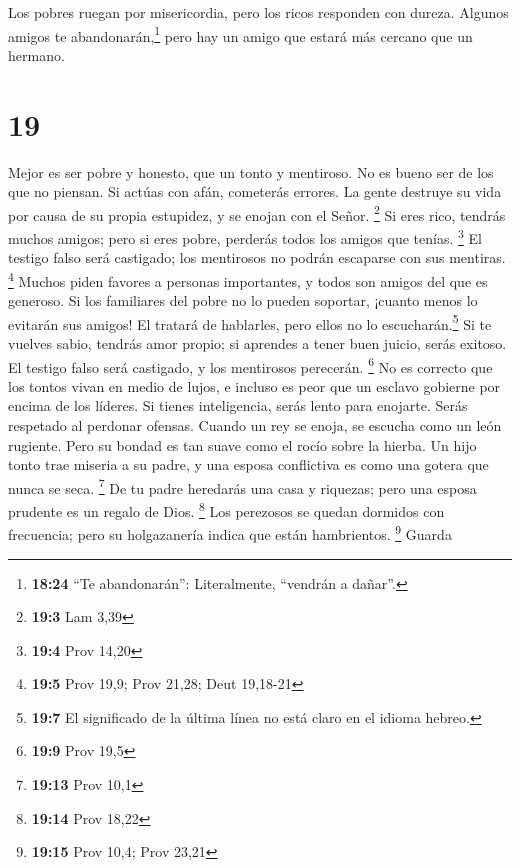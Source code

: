  Los pobres ruegan por misericordia, pero los ricos
responden con dureza.  Algunos amigos te
abandonarán,\footnote{\textbf{18:24} ``Te abandonarán'': Literalmente,
  ``vendrán a dañar''.} pero hay un amigo que estará más cercano que un
hermano.

\hypertarget{section-18}{%
\section{19}\label{section-18}}

 Mejor es ser pobre y honesto, que un tonto y mentiroso.
 No es bueno ser de los que no piensan. Si actúas con
afán, cometerás errores.  La gente destruye su vida por
causa de su propia estupidez, y se enojan con el Señor. \footnote{\textbf{19:3}
  Lam 3,39}  Si eres rico, tendrás muchos amigos; pero si
eres pobre, perderás todos los amigos que tenías. \footnote{\textbf{19:4}
  Prov 14,20}  El testigo falso será castigado; los
mentirosos no podrán escaparse con sus mentiras. \footnote{\textbf{19:5}
  Prov 19,9; Prov 21,28; Deut 19,18-21}  Muchos piden
favores a personas importantes, y todos son amigos del que es generoso.
 Si los familiares del pobre no lo pueden soportar,
¡cuanto menos lo evitarán sus amigos! El tratará de hablarles, pero
ellos no lo escucharán.\footnote{\textbf{19:7} El significado de la
  última línea no está claro en el idioma hebreo.}  Si te
vuelves sabio, tendrás amor propio; si aprendes a tener buen juicio,
serás exitoso.  El testigo falso será castigado, y los
mentirosos perecerán. \footnote{\textbf{19:9} Prov 19,5} 
No es correcto que los tontos vivan en medio de lujos, e incluso es peor
que un esclavo gobierne por encima de los líderes.  Si
tienes inteligencia, serás lento para enojarte. Serás respetado al
perdonar ofensas.  Cuando un rey se enoja, se escucha
como un león rugiente. Pero su bondad es tan suave como el rocío sobre
la hierba.  Un hijo tonto trae miseria a su padre, y una
esposa conflictiva es como una gotera que nunca se seca. \footnote{\textbf{19:13}
  Prov 10,1}  De tu padre heredarás una casa y riquezas;
pero una esposa prudente es un regalo de Dios. \footnote{\textbf{19:14}
  Prov 18,22}  Los perezosos se quedan dormidos con
frecuencia; pero su holgazanería indica que están hambrientos.
\footnote{\textbf{19:15} Prov 10,4; Prov 23,21}  Guarda
